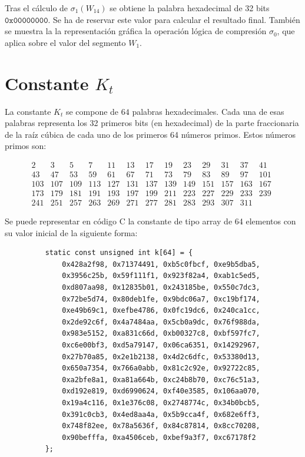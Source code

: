 \documentclass{article}
\begin{document}
        Tras el cálculo de $\sigma_{1}(W_{14})$ se obtiene la palabra hexadecimal de 32 bits $\texttt{0x00000000}$. Se ha de reservar este valor para calcular el resultado final. También se muestra la la representación gráfica la operación lógica de compresión $\sigma_{0}$, que aplica sobre el valor del segmento $W_{1}$.
        
\section{Constante $K_{t}$}
    La constante $K_{t}$ se compone de $64$ palabras hexadecimales. Cada una de esas palabras representa los 32 primeros bits (en hexadecimal) de la parte fraccionaria de la raíz cúbica de cada uno de los primeros 64 números primos. Estos números primos son:
        \begin{figure}[H]
        \centering
        $\begin{array}{llllllllllllllll}
            2 & 3 & 5 & 7 & 11 & 13 & 17 & 19 & 23 & 29 & 31 & 37 & 41 \\
            43 & 47 & 53 & 59 & 61 & 67 & 71 & 73 & 79 & 83 & 89 & 97 & 101 \\
            103 & 107 & 109 & 113 & 127 & 131 & 137 & 139 & 149 & 151 & 157 & 163 & 167 \\
            173 & 179 & 181 & 191 & 193 & 197 & 199 & 211 & 223 & 227 & 229 & 233 & 239 \\
            241 & 251 & 257 & 263 & 269 & 271 & 277 & 281 & 283 & 293 & 307 & 311 & 
        \end{array}$
        \end{figure}
    
    Se puede representar en código C la constante de tipo array de 64 elementos con su valor inicial de la siguiente forma:
        \begin{figure}[H]
        \centering
            \begin{verbatim}
    static const unsigned int k[64] = {
    	0x428a2f98, 0x71374491, 0xb5c0fbcf, 0xe9b5dba5,
    	0x3956c25b, 0x59f111f1, 0x923f82a4, 0xab1c5ed5,
    	0xd807aa98, 0x12835b01, 0x243185be, 0x550c7dc3,
    	0x72be5d74, 0x80deb1fe, 0x9bdc06a7, 0xc19bf174,
    	0xe49b69c1, 0xefbe4786, 0x0fc19dc6, 0x240ca1cc,
    	0x2de92c6f, 0x4a7484aa, 0x5cb0a9dc, 0x76f988da,
    	0x983e5152, 0xa831c66d, 0xb00327c8, 0xbf597fc7,
    	0xc6e00bf3, 0xd5a79147, 0x06ca6351, 0x14292967,
    	0x27b70a85, 0x2e1b2138, 0x4d2c6dfc, 0x53380d13,
    	0x650a7354, 0x766a0abb, 0x81c2c92e, 0x92722c85,
    	0xa2bfe8a1, 0xa81a664b, 0xc24b8b70, 0xc76c51a3,
    	0xd192e819, 0xd6990624, 0xf40e3585, 0x106aa070,
    	0x19a4c116, 0x1e376c08, 0x2748774c, 0x34b0bcb5,
    	0x391c0cb3, 0x4ed8aa4a, 0x5b9cca4f, 0x682e6ff3,
    	0x748f82ee, 0x78a5636f, 0x84c87814, 0x8cc70208,
    	0x90befffa, 0xa4506ceb, 0xbef9a3f7, 0xc67178f2
    };
            \end{verbatim}
        \end{figure}
\end{document}
